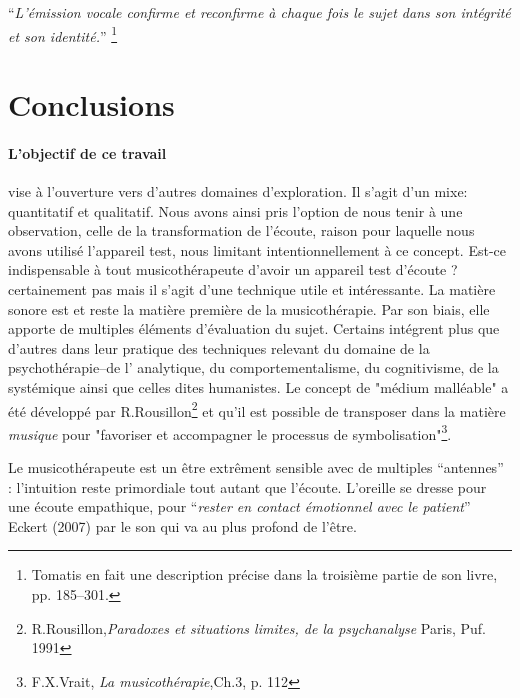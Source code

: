 \enquote{\emph{L'émission vocale confirme et reconfirme à chaque
fois le sujet dans son intégrité et son identité.}}%
\autocite{tomatis:loreille}\footnote{Tomatis en fait une description précise dans la troisième partie de
son livre, pp. 185--301.}



  



\section{Conclusions}

\label{Conclusions}

\paragraph{L'objectif de ce travail} vise à l'ouverture vers d'autres
domaines d'exploration. 
  Il s'agit d'un mixe: quantitatif et qualitatif. Nous avons ainsi pris l'option de nous tenir à une
  observation, celle de la transformation de l'écoute, raison pour
  laquelle nous avons utilisé l'appareil test, nous limitant intentionnellement
     à ce concept.
  Est-ce indispensable à tout musicothérapeute d'avoir un
        appareil test d'écoute ? certainement pas mais il s'agit d'une technique
        utile et intéressante. 
 La matière sonore est et reste la matière première de la  musicothérapie. 
 Par son biais, elle  apporte de multiples éléments d'évaluation du
 sujet. 
 Certains  intégrent plus que d'autres dans leur pratique des techniques relevant du domaine de la psychothérapie--de l' analytique, 
  du comportementalisme, du cognitivisme, de la  systémique ainsi que
  celles dites humanistes.  Le concept de "médium malléable" a été
  développé par  R.Rousillon\footnote{R.Rousillon,\textit{Paradoxes et situations limites,  
  		de la psychanalyse} Paris, Puf. 1991} 
  et qu'il est possible de transposer dans la matière \textit{musique} 
  pour "favoriser et accompagner le processus 
  de symbolisation"\footnote{F.X.Vrait, \textit{La musicothérapie},Ch.3, p. 112}.

 Le musicothérapeute est un être extrêment sensible avec de multiples
 ``antennes'' : l'intuition reste primordiale tout autant que  
 l'écoute. L'oreille se dresse pour une écoute empathique, pour ``\textit{rester en contact émotionnel  
 avec le patient}'' Eckert (2007) par le son qui va au plus profond de
 l'être.

